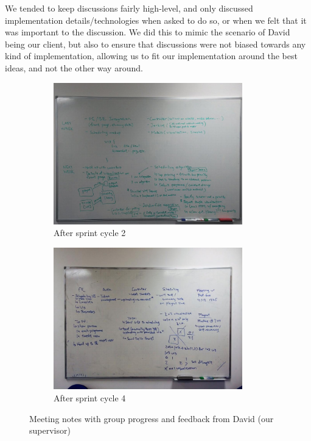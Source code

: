 \documentclass[a4paper, titlepage]{article}
\begin{document}
We tended to keep discussions fairly high-level, and only discussed implementation details/technologies when asked to do so, or when we felt that it was important to the discussion. We did this to mimic the scenario of David being our client, but also to ensure that discussions were not biased towards any kind of implementation, allowing us to fit our implementation around the best ideas, and not the other way around.

\begin{figure}[h!]
  \begin{subfigure}{0.5\textwidth}
    \centering
    \includegraphics[width = 0.9\textwidth, trim = 0 0.4cm 0 1.6cm, clip]{./eval/meeting-board2.jpg}
    \caption{After sprint cycle 2}
  \end{subfigure}
  \begin{subfigure}{0.5\textwidth}
    \centering
    \includegraphics[width = 0.9\textwidth, trim = 1.2cm 1.5cm 1.2cm 2.5cm, clip]{./eval/meeting-board.jpg}
    \caption{After sprint cycle 4}
  \end{subfigure}
  \caption{Meeting notes with group progress and feedback from David (our supervisor)}
  \label{fig:eval_meetingboard}
\end{figure}
\end{document}
